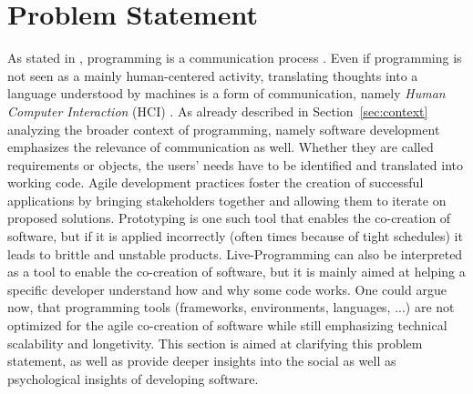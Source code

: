 

\section{Problem Statement}
As stated in , programming is a communication process \cite{anonymous_what_1967}.
Even if programming is not seen as a mainly human-centered activity, translating thoughts into a language understood by machines is a form of communication, namely \emph{Human Computer Interaction} (HCI) \cite{myers_past_2009}.
As already described in Section~\ref{sec:context} analyzing the broader context of programming, namely software development emphasizes the relevance of communication as well.
Whether they are called requirements or objects, the users' needs have to be identified and translated into working code.
Agile development practices foster the creation of successful applications by bringing stakeholders together and allowing them to iterate on proposed solutions.
Prototyping is one such tool that enables the co-creation of software, but if it is applied incorrectly (often times because of tight schedules) it leads to brittle and unstable products.
Live-Programming can also be interpreted as a tool to enable the co-creation of software, but it is mainly aimed at helping a specific developer understand how and why some code works.
One could argue now, that programming tools (frameworks, environments, languages, ...) are not optimized for the agile co-creation of software while still emphasizing technical scalability and longetivity.
This section is aimed at clarifying this problem statement, as well as provide deeper insights into the social as well as psychological insights of developing software.


